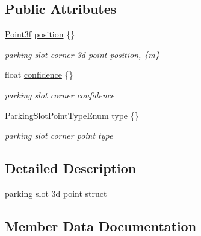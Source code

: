 \subsection*{Public Attributes}
\begin{DoxyCompactItemize}
\item 
\hyperlink{structmaf__perception__interface_1_1Point3f}{Point3f} \hyperlink{structmaf__perception__interface_1_1ParkingSlotPoint3d_a31bb8ee504963fd50971f7d7937275d1}{position} \{\}
\begin{DoxyCompactList}\small\item\em parking slot corner 3d point position, \{m\} \end{DoxyCompactList}\item 
float \hyperlink{structmaf__perception__interface_1_1ParkingSlotPoint3d_a75929ff829c2efc691317ec192ebec39}{confidence} \{\}
\begin{DoxyCompactList}\small\item\em parking slot corner confidence \end{DoxyCompactList}\item 
\hyperlink{structmaf__perception__interface_1_1ParkingSlotPointTypeEnum}{Parking\+Slot\+Point\+Type\+Enum} \hyperlink{structmaf__perception__interface_1_1ParkingSlotPoint3d_a0357ad8818b551c18866d42d37bc8df0}{type} \{\}
\begin{DoxyCompactList}\small\item\em parking slot corner point type \end{DoxyCompactList}\end{DoxyCompactItemize}


\subsection{Detailed Description}
parking slot 3d point struct 

\subsection{Member Data Documentation}
\mbox{\label{structmaf__perception__interface_1_1ParkingSlotPoint3d_a75929ff829c2efc691317ec192ebec39}} 
